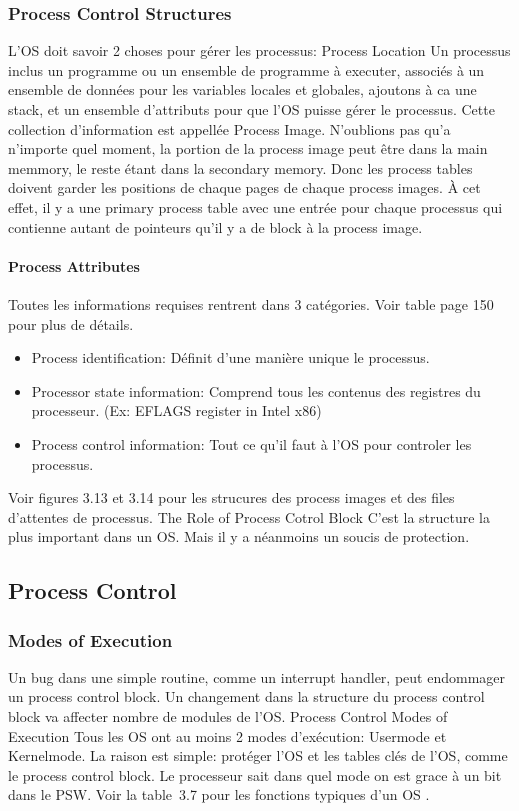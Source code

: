 \subsubsection{Process Control Structures}
L'OS doit savoir 2 choses pour gérer les processus:
Process Location
Un processus inclus un programme ou un ensemble de programme à executer, associés à un ensemble de données pour les variables locales et globales, ajoutons à ca une stack, et un ensemble d'attributs pour que l'OS puisse gérer le processus.
Cette collection d'information est appellée Process Image.
N'oublions pas qu'a n'importe quel moment, la portion de la process image peut être dans la main memmory, le reste étant dans la secondary memory.
Donc les process tables doivent garder les positions de chaque pages de chaque process images.
À cet effet, il y a une primary process table avec une entrée pour chaque processus qui contienne autant de pointeurs qu'il y a de block à la process image.

\paragraph{Process Attributes}
Toutes les informations requises rentrent dans 3 catégories.
Voir table page 150 pour plus de détails.
\begin{itemize}
  \item Process identification: Définit d'une manière unique le processus.
  \item Processor state information: Comprend tous les contenus des registres du processeur.
    (Ex: EFLAGS register in Intel x86)
  \item Process control information: Tout ce qu'il faut à l'OS pour controler les processus.
\end{itemize}
Voir figures 3.13 et 3.14 \cite[p.~153-154]{stallings} pour les strucures des process images et des files d'attentes de processus.
The Role of Process Cotrol Block
C'est la structure la plus important dans un OS.
Mais il y a néanmoins un soucis de protection.

\subsection{Process Control}
\subsubsection{Modes of Execution}
Un bug dans une simple routine, comme un interrupt handler, peut endommager un process control block.
Un changement dans la structure du process control block va affecter nombre de modules de l'OS.
Process Control Modes of Execution
Tous les OS ont au moins 2 modes d'exécution: Usermode et Kernelmode.
La raison est simple: protéger l'OS et les tables clés de l'OS, comme le process control block.
Le processeur sait dans quel mode on est grace à un bit dans le PSW.
Voir la table~3.7 pour les fonctions typiques d'un OS \cite[p.~135]{stallings}.

